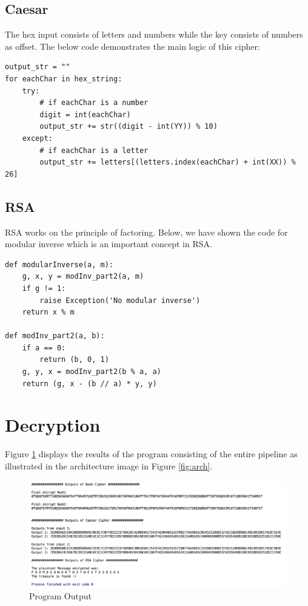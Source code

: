 \documentclass[12pt]{article}
\begin{document}
\subsection{Caesar}
The hex input consists of letters and numbers while the key consists of numbers as offset. The below code demonstrates the main logic of this cipher:
\begin{lstlisting}
output_str = ""
for eachChar in hex_string:
    try:
    	# if eachChar is a number
        digit = int(eachChar)
        output_str += str((digit - int(YY)) % 10)
    except:
    	# if eachChar is a letter
        output_str += letters[(letters.index(eachChar) + int(XX)) % 26]
\end{lstlisting}
\subsection{RSA}
RSA works on the principle of factoring. Below, we have shown the code for modular inverse which is an important concept in RSA. 
\begin{lstlisting}
def modularInverse(a, m):
    g, x, y = modInv_part2(a, m)
    if g != 1:
        raise Exception('No modular inverse')
    return x % m

def modInv_part2(a, b):
    if a == 0:
        return (b, 0, 1)
    g, y, x = modInv_part2(b % a, a)
    return (g, x - (b // a) * y, y)
\end{lstlisting}

\section{Decryption}
Figure \ref{fig:output} displays the results of the program consisting of the entire pipeline as illustrated in the architecture image in Figure \ref{fig:arch}. 
\begin{figure}[h]
  \includegraphics[scale=0.52]{output}
  \caption{Program Output}
  \label{fig:output}
\end{figure}
\end{document}
